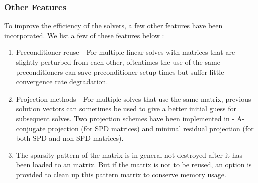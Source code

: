 \subsubsection{Other Features} 

To improve the efficiency of the \hypre{} solvers, a few other features have been
incorporated.  We list a few of these features below :

\begin{enumerate}
\item Preconditioner reuse - For multiple linear solves with matrices that are
      slightly perturbed from each other, oftentimes the use of the same 
      preconditioners can save preconditioner setup times but suffer little
      convergence rate degradation.
\item Projection methods - For multiple solves that use the same matrix,
      previous solution vectors can sometimes be used to give a better initial
      guess for subsequent solves.  Two projection schemes have been implemented
      in \hypre{} - A-conjugate projection (for SPD matrices) and minimal residual
      projection (for both SPD and non-SPD matrices).
\item The sparsity pattern of the matrix is in general not destroyed after
      it has been loaded to an \hypre{} matrix.  But if the matrix is not to
      be reused, an option is provided to clean up this pattern matrix to
      conserve memory usage.
\end{enumerate}
